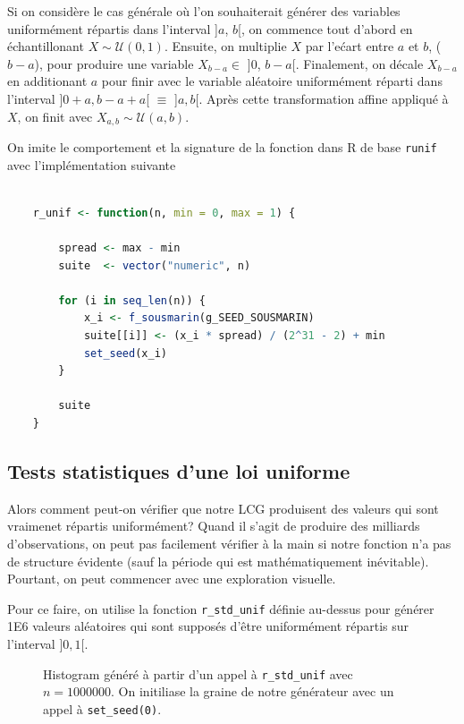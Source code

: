 \documentclass[10pt]{article} %
\begin{document}
Si on considère le cas générale où l'on souhaiterait générer des variables uniformément répartis dans l'interval ]$a$, $b$[, on commence tout d'abord
en échantillonant $X \sim \mathcal{U}(0, 1)$. Ensuite, on multiplie $X$ par l'ećart entre $a$ et $b$, ($b - a$), pour produire une variable $X_{b - a} \in$ ]$0$, $b - a$[. Finalement,
on décale $X_{b - a}$ en additionant $a$ pour finir avec le variable aléatoire uniformément réparti dans l'interval ]$0 + a, b - a + a$[ $\equiv $ ]$a, b$[. Après cette transformation affine appliqué à
$X$, on finit avec $X_{a,b} \sim \mathcal{U}(a, b)$.

On imite le comportement et la signature de la fonction dans R de base \texttt{runif} avec l'implémentation suivante

\begin{lstlisting}[language=R]

    r_unif <- function(n, min = 0, max = 1) {

        spread <- max - min
        suite  <- vector("numeric", n)

        for (i in seq_len(n)) {
            x_i <- f_sousmarin(g_SEED_SOUSMARIN)
            suite[[i]] <- (x_i * spread) / (2^31 - 2) + min
            set_seed(x_i)
        }

        suite
    }

\end{lstlisting}


\subsection{Tests statistiques d'une loi uniforme}

Alors comment peut-on vérifier que notre LCG produisent des valeurs qui sont vraimenet répartis uniformément? Quand il s'agit de produire
des milliards d'observations, on peut pas facilement vérifier à la main si notre fonction n'a pas de structure évidente (sauf la période qui est mathématiquement inévitable).
Pourtant, on peut commencer avec une exploration visuelle.

Pour ce faire, on utilise la fonction \texttt{r\_std\_unif} définie au-dessus pour générer 1E6 valeurs aléatoires qui sont supposés d'être uniformément
répartis sur l'interval ]$0, 1$[.

\begin{figure}[h!]
    \centering
    

    \vspace{-1cm}
    \caption{Histogram généré à partir d'un appel à \texttt{r\_std\_unif} avec $n = 1000000$. On initiliase la graine de notre
    générateur avec un appel à \texttt{set\_seed(0)}.}

\end{figure}
\end{document}
